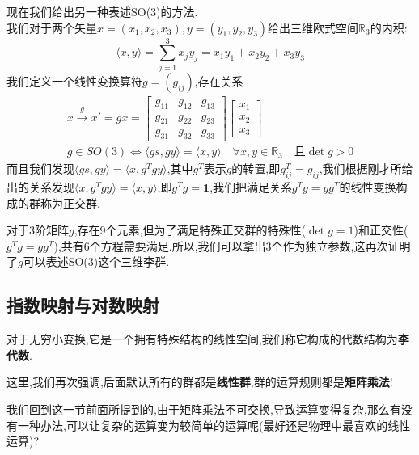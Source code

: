 \begin{example}
    现在我们给出另一种表述SO(3)的方法.\\
    我们对于两个矢量$x=(x_1,x_2,x_3),y=(y_1,y_2,y_3)$给出三维欧式空间$\mathbb{R}_3$的内积:
    \begin{equation}
        \langle x,y\rangle=\sum_{j=1}^{3}x_j y_j=x_1y_1+x_2y_2+x_3y_3
    \end{equation}
    我们定义一个线性变换算符$g=(g_{ij})$,存在关系
    \begin{equation}
        \begin{aligned}
            x\xrightarrow{g}x'=gx=\begin{bmatrix}g_{11}&g_{12}&g_{13}\\g_{21}&g_{22}&g_{23}\\g_{31}&g_{32}&g_{33}\end{bmatrix}\begin{bmatrix}x_1\\x_2\\x_3\end{bmatrix}\\ g\in SO(3)\Leftrightarrow\langle gs,gy\rangle=\langle x,y\rangle\quad\forall x,y\in\mathbb{R}_3\quad\text{且}\det g>0
        \end{aligned}
    \end{equation}
    而且我们发现$\langle gs,gy\rangle=\langle x,g^Tgy\rangle$,其中$g^T$表示$g$的转置,即$g_{ij}^T=g_{ij}$,我们根据刚才所给出的关系发现$\langle x,g^Tgy\rangle=\langle x,y\rangle$,即$g^Tg=\textbf{1}$,我们把满足关系$g^Tg=gg^T$的线性变换构成的群称为正交群.
    
    对于3阶矩阵$g$,存在9个元素,但为了满足特殊正交群的特殊性($\det g=1$)和正交性($g^Tg=gg^T$),共有6个方程需要满足.所以,我们可以拿出3个作为独立参数,这再次证明了$g$可以表述SO(3)这个三维李群.
\end{example}
\subsection{指数映射与对数映射}
对于无穷小变换,它是一个拥有特殊结构的线性空间,我们称它构成的代数结构为\textbf{李代数}.

这里,我们再次强调,后面默认所有的群都是\textbf{线性群},群的运算规则都是\textbf{矩阵乘法}!

我们回到这一节前面所提到的,由于矩阵乘法不可交换,导致运算变得复杂,那么有没有一种办法,可以让复杂的运算变为较简单的运算呢(最好还是物理中最喜欢的线性运算)?

